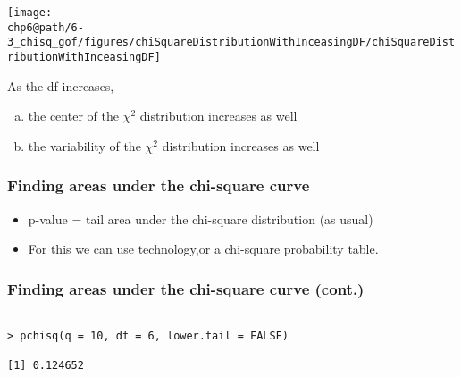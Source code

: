 \documentclass[slidestop,compress,mathserif]{beamer}
\makeatletter
\def\chp6@path{../../Chp 6}
\makeatother
\begin{document}
\begin{frame}
\frametitle{}


\begin{center}
\texttt{[image: \\chp6@path/6-3\_chisq\_gof/figures/chiSquareDistributionWithInceasingDF/chiSquareDistributionWithInceasingDF]}
\end{center}

As the df increases,
\begin{enumerate}[(a)]
\item the center of the $\chi^2$ distribution increases as well
\item the variability of the $\chi^2$ distribution increases as well
\end{enumerate}

\end{frame}


\begin{frame}[fragile]
\frametitle{Finding areas under the chi-square curve}

\begin{itemize}

\item p-value = tail area under the chi-square distribution (as usual)

\pause

\item For this we can use technology,or a chi-square probability table.

\end{itemize}

\end{frame}


\begin{frame}[fragile]
\frametitle{Finding areas under the chi-square curve (cont.)}


\pause

\begin{verbatim}

> pchisq(q = 10, df = 6, lower.tail = FALSE)

[1] 0.124652

\end{verbatim}

\end{frame}
\end{document}
